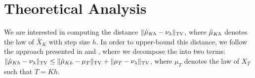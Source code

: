 
\section{Theoretical Analysis}

\newcommand{\minvsp}{-5}

We are interested in computing the distance $\| \hat{\mu}_{Kh} - \nu_\lambda \|_{\textnormal{TV}}$, where $\hat{\mu}_{Kh}$ denotes the law of $\bar{X}_K$ with step size $h$. In order to upper-bound this distance, we follow the approach presented in \cite{dalalyan2017theoretical} and \cite{raginsky17a}, where we decompose the into two terms: $\| \hat{\mu}_{Kh} - \nu_\lambda \|_{\textnormal{TV}} \leq \| \hat{\mu}_{Kh} - \mu_T \|_{\textnormal{TV}} + \| \mu_{T} - \nu_\lambda \|_{\textnormal{TV}}$, where $\mu_T$ denotes the law of $X_T$ such that $T=Kh$.



